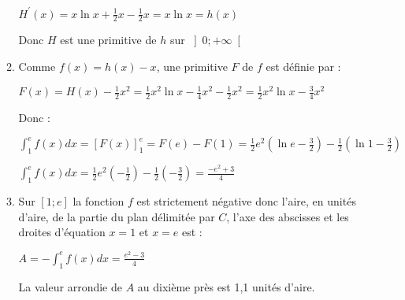 \begin{corrige}
\begin{enumerate}
\begin{enumerate}[label=\alph*.]
               \par
               $H^{\prime}\left(x\right)=x\ln x+\frac{1}{2}x-\frac{1}{2}x=x\ln x=h\left(x\right)$
               \par
               Donc $H$ est une primitive de $h$ sur $\left]0; +\infty \right[$
               \item
               Comme $f\left(x\right)=h\left(x\right)-x$, une primitive $F$ de $f$ est définie par :
               \par
               $F\left(x\right)=H\left(x\right)-\frac{1}{2}x^{2}=\frac{1}{2}x^{2} \ln x-\frac{1}{4} x^{2}-\frac{1}{2}x^{2}=\frac{1}{2}x^{2} \ln x-\frac{3}{4} x^{2}$
               \par
               Donc :
               \par
               $\int_{1}^{e}f\left(x\right)dx=\left[F\left(x\right)\right]_{1}^{e}=F\left(e\right)-F\left(1\right)=\frac{1}{2}e^{2}\left(\ln e-\frac{3}{2}\right)-\frac{1}{2}\left(\ln 1-\frac{3}{2}\right)$
               \par
               $\int_{1}^{e}f\left(x\right)dx=\frac{1}{2}e^{2}\left(-\frac{1}{2}\right)-\frac{1}{2}\left(-\frac{3}{2}\right)=\frac{-e^{2}+3}{4}$
               \item
               Sur $\left[1; e\right]$ la fonction $f$ est strictement négative donc l'aire, en unités d'aire, de la partie du plan délimitée par $C$, l'axe des abscisses et les droites d'équation $x=1$ et $x=e$ est :
               \par
               $A=-\int_{1}^{e}f\left(x\right)dx=\frac{e^{2}-3}{4}$
               \par
               La valeur arrondie de $A$ au dixième près est 1,1 unités d'aire.
          \end{enumerate}
     \end{enumerate}
\end{corrige}
